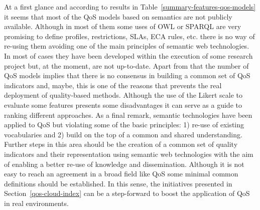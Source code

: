 At a first glance and according to results in Table~\ref{summary-features-qos-models} it seems that most of the QoS models 
based on semantics are not publicly available. Although in most of them some uses of OWL or SPARQL are very promising 
to define profiles, restrictions, SLAs, ECA rules, etc. there is no way of re-using them avoiding one of the main 
principles of semantic web technologies. In most of cases they have been developed within the execution of some 
research project but, at the moment, are not up-to-date. Apart from that the number of QoS models implies that 
there is no consensus in building a common set of QoS indicators and, maybe, this is one of the reasons that 
prevents the real deployment of quality-based methods. Although the use of the Likert scale to evaluate 
some features presents some disadvantages it can serve as a guide to ranking different approaches. As a final remark, semantic 
technologies have been applied to QoS but violating some of the basic principles: 1) re-use of existing vocabularies and 2) 
build on the top of a common and shared understanding. Further steps in this area should be the creation of a common set 
of quality indicators and their representation using semantic web technologies with the aim of enabling a better 
re-use of knowledge and dissemination. Although it is not easy to reach an agreement in a broad field like QoS some 
minimal common definitions should be established. In this sense, the initiatives presented in Section~\ref{qos-cloud-index} 
can be a step-forward to boost the application of QoS in real environments.

\clearpage
